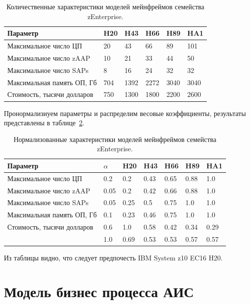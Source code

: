 \documentclass[russian,utf8,emptystyle]{eskdtext}
\begin{document}
\begin{longtable}{p{5cm}|p{1.5cm}|p{1.5cm}|p{1.5cm}|p{1.5cm}|p{1.5cm}}
\caption{Количественные характеристики моделей мейнфреймов семейства zEnterprise.}
\label{tab:mainframe-1} \\
Параметр                    & H20 & H43 & H66 & H89 & HA1 \\
\hline
Максимальное число ЦП       & 20  & 43  & 66  & 89  & 101 \\
Максимальное число zAAP     & 10  & 21  & 33  & 44  & 50 \\
Максимальное число SAPs     & 8   & 16  & 24  & 32  & 32 \\
Максимальная память ОП, Гб  & 704 &1392 &2272 &3040 &3040 \\
Стоимость, тысячи долларов  & 750 &1300 &1800 &2200 &2600 \\
\end{longtable}

Пронормализиуем параметры и распределим весовые коэффициенты, результаты представлены в таблице~\ref{tab:mainframe-2}.

\begin{longtable}{p{5cm}|p{1.5cm}|p{1.5cm}|p{1.5cm}|p{1.5cm}|p{1.5cm}|p{1.5cm}}
\caption{Нормализованные характеристики моделей мейнфреймов семейства zEnterprise.}
\label{tab:mainframe-2} \\
Параметр                    & $\alpha$ & H20 & H43 & H66 & H89 & HA1 \\
\hline
Максимальное число ЦП       & 0.2      & 0.2 & 0.43& 0.65& 0.88& 1.0 \\
Максимальное число zAAP     & 0.05     & 0.2 & 0.42& 0.66& 0.88& 1.0 \\
Максимальное число SAPs     & 0.05     & 0.25& 0.5 & 0.75& 1.0 & 1.0 \\
Максимальная память ОП, Гб  & 0.1      & 0.23& 0.46& 0.75& 1.0 & 1.0 \\
Стоимость, тысячи долларов  & 0.6      & 1.0 & 0.58& 0.42& 0.34& 0.29 \\
\hline
                            & 1.0      & 0.69& 0.53& 0.53& 0.57& 0.57 \\
\end{longtable}

Из таблицы видно, что следует предпочесть IBM System z10 EC16 H20.

\section{Модель бизнес процесса АИС}
\end{document}

